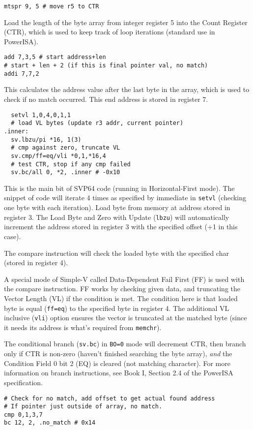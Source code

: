 \begin{verbatim}
mtspr 9, 5 # move r5 to CTR
\end{verbatim}
Load the length of the byte array from integer register 5 into
the Count Register (CTR), which is used to keep track of loop iterations
(standard use in PowerISA).

\begin{verbatim}
add 7,3,5 # start address+len
# start + len + 2 (if this is final pointer val, no match)
addi 7,7,2
\end{verbatim}
This calculates the address value after the last byte in the array, which is
used to check if no match occurred. This end address is stored in register 7.

\begin{verbatim}
  setvl 1,0,4,0,1,1
  # load VL bytes (update r3 addr, current pointer)
.inner:
  sv.lbzu/pi *16, 1(3)
  # cmp against zero, truncate VL
  sv.cmp/ff=eq/vli *0,1,*16,4
  # test CTR, stop if any cmp failed
  sv.bc/all 0, *2, .inner # -0x10
\end{verbatim}
This is the main bit of SVP64 code (running in Horizontal-First mode).
The snippet of code will iterate 4 times as specified by immediate
in \texttt{setvl} (checking one byte with each iteration).
Load byte from memory at address stored in register 3.
The Load Byte and Zero with Update (\texttt{lbzu}) will automatically increment
the address stored in register 3 with the specified offset (+1 in this case).

The compare instruction will check the loaded byte with the specified char
(stored in register 4).

A special mode of Simple-V called Data-Dependent Fail First (FF) is used with
the compare instruction. FF works by checking given data, and truncating the
Vector Length (VL) if the condition is met. The condition here is that
loaded byte is equal (\texttt{ff=eq}) to the specified byte in register 4.
The additional VL inclusive (\texttt{vli}) option ensures the vector is
truncated at the matched byte (since it needs its address is what's required
from \texttt{memchr}).

The conditional branch (\texttt{sv.bc}) in \texttt{BO=0} mode will decrement
CTR, then branch only if CTR is non-zero (haven't finished searching the
byte array), \textit{and} the Condition Field 0 bit 2 (EQ) is cleared
(not matching character). For more information on branch instructions,
see Book I, Section 2.4 of the PowerISA specification.

\begin{verbatim}
# Check for no match, add offset to get actual found address
# If pointer just outside of array, no match.
cmp 0,1,3,7
bc 12, 2, .no_match # 0x14
\end{verbatim}


